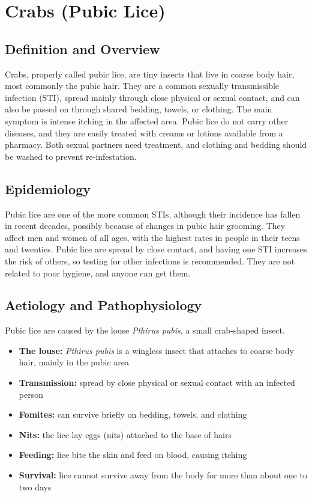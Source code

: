 \chapter{Crabs (Pubic Lice)}

\section*{Definition and Overview}
Crabs, properly called pubic lice, are tiny insects that live in coarse body hair, most commonly the pubic hair. They are a common sexually transmissible infection (STI), spread mainly through close physical or sexual contact, and can also be passed on through shared bedding, towels, or clothing. The main symptom is intense itching in the affected area. Pubic lice do not carry other diseases, and they are easily treated with creams or lotions available from a pharmacy. Both sexual partners need treatment, and clothing and bedding should be washed to prevent re-infestation.

\section*{Epidemiology}
Pubic lice are one of the more common STIs, although their incidence has fallen in recent decades, possibly because of changes in pubic hair grooming. They affect men and women of all ages, with the highest rates in people in their teens and twenties. Pubic lice are spread by close contact, and having one STI increases the risk of others, so testing for other infections is recommended. They are not related to poor hygiene, and anyone can get them.

\section*{Aetiology and Pathophysiology}
Pubic lice are caused by the louse \textit{Pthirus pubis}, a small crab-shaped insect.

\begin{itemize}
    \item \textbf{The louse:} \textit{Pthirus pubis} is a wingless insect that attaches to coarse body hair, mainly in the pubic area
    \item \textbf{Transmission:} spread by close physical or sexual contact with an infected person
    \item \textbf{Fomites:} can survive briefly on bedding, towels, and clothing
    \item \textbf{Nits:} the lice lay eggs (nits) attached to the base of hairs
    \item \textbf{Feeding:} lice bite the skin and feed on blood, causing itching
    \item \textbf{Survival:} lice cannot survive away from the body for more than about one to two days
\end{itemize}

